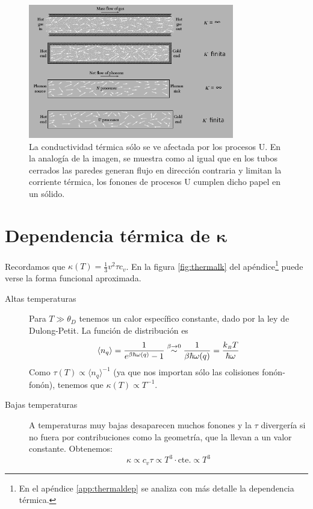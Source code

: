 \begin{figure}
  \centering
  \includegraphics[width=0.8\textwidth]{figures/phononcurrent.png}
  \caption{La conductividad térmica sólo se ve afectada por los
    procesos U. En la analogía de la imagen, se muestra como al igual
    que en los tubos cerrados las paredes generan flujo en dirección
    contraria y limitan la corriente térmica, los fonones de procesos
    U cumplen dicho papel en un sólido.}
  \label{fig:phononcurrent}
\end{figure}

\section{Dependencia térmica de $\boldsymbol{\kappa}$}
\label{sec:ktemp}

Recordamos que $\kappa(T) = \frac{1}{3} v^2 \tau c_v$. En la figura
\ref{fig:thermalk} del apéndice\footnote{En el
    apéndice \ref{app:thermaldep} se analiza con más detalle la
    dependencia térmica.} puede verse la
forma funcional aproximada.

\begin{description}
\item[Altas temperaturas] Para $T \gg \theta_D$ tenemos un calor específico constante, dado por
  la ley de Dulong-Petit. La función de distribución es
  \begin{equation}
    \langle n _q\rangle = \frac{1}{e^{\beta \hbar\omega(q)} -1}
    \stackrel{\beta \to 0}{\sim} \frac{1}{\beta \hbar \omega(q)} =
    \frac{k_{\scriptscriptstyle{B}} T}{\hbar \omega}
  \end{equation}
  Como $\tau(T) \propto \langle n _q\rangle^{-1}$ (ya que nos importan
  sólo las colisiones fonón-fonón), tenemos que
  $\kappa(T) \propto T^{-1}$.
\item[Bajas temperaturas]
  A temperaturas muy bajas desaparecen muchos fonones y la $\tau$
  divergería si no fuera por contribuciones como la geometría, que la
  llevan a un valor constante. Obtenemos:
  \begin{equation} \kappa \propto c_v \tau \propto T^3 \cdot
    \text{cte.} \propto T^3
  \end{equation}
\end{description}

